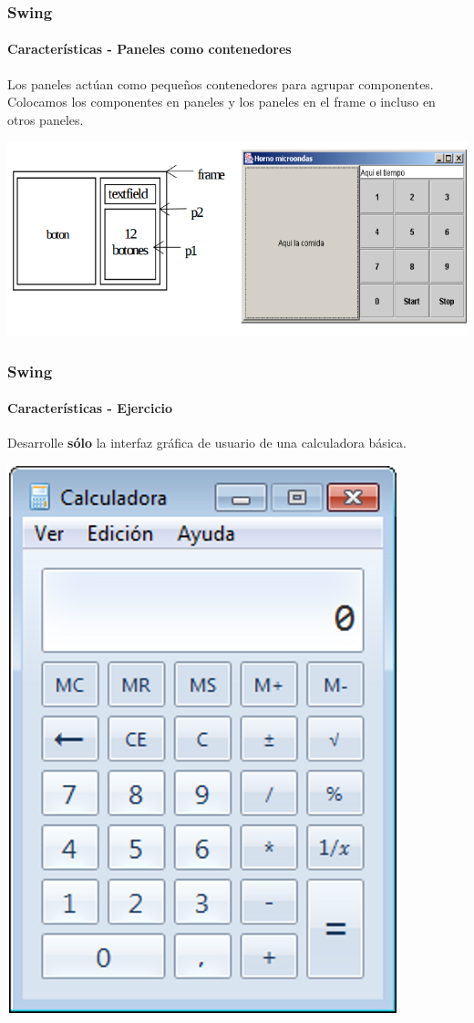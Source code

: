 \documentclass{beamer}
\begin{document}
	
	\begin{frame}
		\frametitle{Swing}
		\framesubtitle{Caracter\'isticas - Paneles como contenedores}

        Los paneles act\'uan como peque\~nos contenedores para agrupar componentes. Colocamos los componentes en paneles y los paneles en el frame o incluso en otros paneles.

	    \begin{center}
	        	\includegraphics[scale=.37]{images/panel-container.png}
	    \end{center}
	\end{frame}			
	
	\begin{frame}
		\frametitle{Swing}
		\framesubtitle{Caracter\'isticas - Ejercicio}

        Desarrolle \textbf{s\'olo} la interfaz gr\'afica de usuario de una calculadora b\'asica.

	    \begin{center}
	        	\includegraphics[scale=.35]{images/calculadora.png}
	    \end{center}
	\end{frame}		
	
\end{document}
